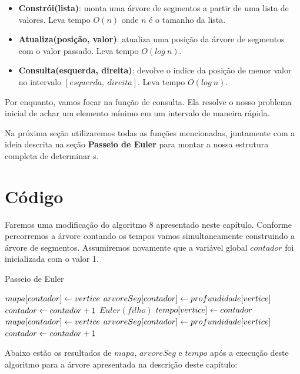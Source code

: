 \begin{itemize}
    \item \textbf{Constrói(lista)}: monta uma árvore de segmentos a partir de uma lista de valores. Leva tempo $O(n)$ onde $n$ é o tamanho da lista.
    \item \textbf{Atualiza(posição, valor)}: atualiza uma posição da árvore de segmentos com o valor passado. Leva tempo $O(log\ n)$.
    \item \textbf{Consulta(esquerda, direita)}: devolve o índice da posição de menor valor no intervalo $[esquerda,\ direita]$. Leva tempo $O(log\ n)$.
\end{itemize}

Por enquanto, vamos focar na função de consulta. Ela resolve o nosso problema inicial de achar um elemento mínimo em um intervalo de maneira rápida.

Na próxima seção utilizaremos todas as funções mencionadas, juntamente com a ideia descrita na seção \textbf{Passeio de Euler} para montar a nossa estrutura completa de determinar \LCA s.

\section{Código}

Faremos uma modificação do algoritmo 8 apresentado neste capítulo. Conforme percorremos a árvore contando os tempos vamos simultaneamente construindo a árvore de segmentos. Assumiremos novamente que a variável global $contador$ foi inicializada com o valor 1.

\begin{algorithm}[H]
\caption{Passeio de Euler}
\begin{algorithmic}[1]
        \State $mapa[contador] \leftarrow vertice$
        \State $arvoreSeg[contador] \leftarrow profundidade[vertice]$
        \State $contador \leftarrow contador + 1$
        \State $Euler(filho)$
    \EndFor
    \State $tempo[vertice] \leftarrow contador$
    \State $mapa[contador] \leftarrow vertice$
    \State $arvoreSeg[contador] \leftarrow profundidade[vertice]$
    \State $contador \leftarrow contador + 1$
\EndFunction
\end{algorithmic}
\end{algorithm}

Abaixo estão os resultados de $mapa$, $arvoreSeg$ e $tempo$ após a execução deste algoritmo para a árvore apresentada na descrição deste capítulo:

